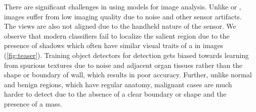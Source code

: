 There are significant challenges in using \cnn models for \usg image analysis. Unlike \mri or \ct, \usg images suffer from low imaging quality due to noise and other sensor artifacts. The views are also not aligned due to the handheld nature of the sensor. We observe that modern \cnn classifiers fail to localize the salient \gb region due to the presence of shadows which often have similar visual traits of a \gb in \usg images (\cref{fig:teaser}). Training object detectors for \gbc detection gets biased towards learning from spurious textures due to noise and adjacent organ tissues rather than the shape or boundary of \gb wall, which results in poor accuracy. Further, unlike normal and benign \gb regions, which have regular anatomy, malignant cases are much harder to detect due to the absence of a clear \gb boundary or shape and the presence of a mass.

